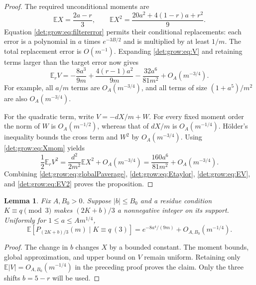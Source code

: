 \documentclass[11pt,letterpaper]{article}
\numberwithin{equation}{section}
\newtheorem{lemma}[theorem]{Lemma}
\theoremstyle{definition}\newtheorem{definition}[theorem]{Definition}
\theoremstyle{remark}\newtheorem{remark}[theorem]{Remark}
\newcommand{\E}{\mathbb E}
\begin{document}
\begin{proof}
The required unconditional moments are
\begin{equation}\label{det:grow:eq:Xmom}
 \E X=\frac{2a-r}{3},\qquad
 \E X^2=\frac{20a^2+4(1-r)a+r^2}{9}.
\end{equation}
Equation \eqref{det:grow:eq:filtererror} permits their conditional replacements:
each error is a polynomial in $a$ times $e^{-3B/2}$ and is multiplied by
at least $1/m$. The total replacement error is $O(m^{-1})$.
Expanding \eqref{det:grow:eq:V} and retaining terms larger than the target error
now gives
\begin{equation}\label{det:grow:eq:EV}
 \E_rV=-\frac{8a^3}{9m}+\frac{4(r-1)a^2}{9m}
                       -\frac{32a^6}{81m^2}+O_A(m^{-3/4}).
\end{equation}
For example, all $a/m$ terms are $O_A(m^{-3/4})$, and all terms of
size $(1+a^5)/m^2$ are also $O_A(m^{-3/4})$.

For the quadratic term, write $V=-dX/m+W$. For every fixed moment
order the norm of $W$ is $O_A(m^{-1/2})$, whereas that of $dX/m$ is
$O_A(m^{-1/4})$. H\"older's inequality bounds the cross term and $W^2$
by $O_A(m^{-3/4})$. Using \eqref{det:grow:eq:Xmom} yields
\begin{equation}\label{det:grow:eq:EV2}
 \frac12\E_rV^2=\frac{d^2}{2m^2}\E X^2+O_A(m^{-3/4})
              =\frac{160a^6}{81m^2}+O_A(m^{-3/4}).
\end{equation}
Combining \eqref{det:grow:eq:globalPaverage}, \eqref{det:grow:eq:Etaylor},
\eqref{det:grow:eq:EV}, and \eqref{det:grow:eq:EV2} proves the proposition.
\end{proof}

\begin{lemma}\label{det:grow:lem:shift}
Fix $A,B_0>0$. Suppose $|b|\le B_0$ and a residue condition
$K\equiv q\pmod3$ makes $(2K+b)/3$ a nonnegative integer on its
support. Uniformly for $1\le a\le A m^{1/4}$,
\begin{equation}\label{det:grow:eq:shift}
 \E\left[P_{(2K+b)/3}(m)\mid K\equiv q\ (3)\right]
 =e^{-8a^4/(9m)}+O_{A,B_0}(m^{-1/4}).
\end{equation}
\end{lemma}
\begin{proof}
The change in $b$ changes $X$ by a bounded constant. The moment bounds,
global approximation, and upper bound on $V$ remain uniform. Retaining
only $\E|V|=O_{A,B_0}(m^{-1/4})$ in the preceding proof proves the claim.
Only the three shifts $b=5-r$ will be used.
\end{proof}
\end{document}

